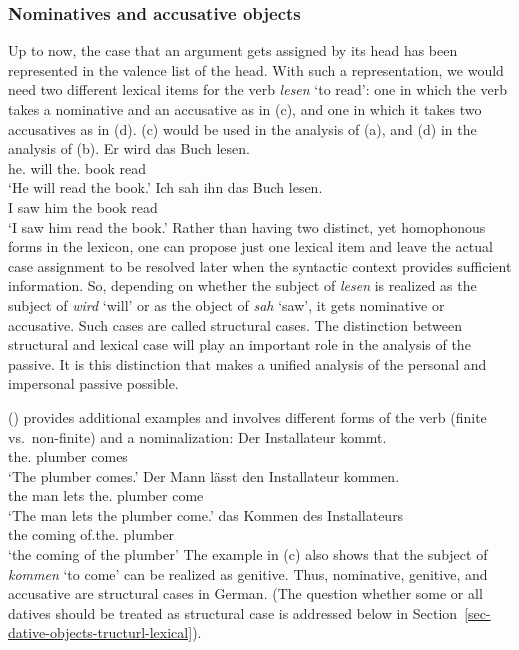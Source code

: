 \subsubsection{Nominatives and accusative objects}

Up to now, the case that an argument gets assigned by its head has been represented in the valence list of
the head. With such a representation, we would need two different lexical items for the verb
\emph{lesen} `to read': one in which the verb takes a nominative and an accusative as in
(c), and one in which it takes two accusatives as in (d). (c) would be used in
the analysis of (a), and (d) in the analysis of (b).
\eal
\ex 
\gll Er        wird das        Buch lesen.\\
     he.\NOM{} will the.\ACC{} book read\\\german
\glt `He will read the book.'
\ex 
\gll Ich sah ihn das Buch lesen.\\
     I   saw him the book read\\
\glt `I saw him read the book.'
\ex {}
\ex {}
\zl
Rather than having two distinct, yet homophonous forms in the lexicon, one can propose just one lexical item and leave the actual
case assignment to be resolved later when the syntactic context provides sufficient information. So,
depending on whether the subject of \emph{lesen} is realized as the 
subject of \emph{wird} `will' or as the object of \emph{sah} `saw', it gets nominative or accusative. Such
cases are called structural cases. The distinction between structural and lexical case will play an
important role in the analysis of the passive. It is this distinction that makes a unified analysis of
the personal and impersonal passive possible.

() provides additional examples and involves different forms of the verb (finite
vs.\ non-finite) and a nominalization:
\eal
\ex 
\gll Der Installateur kommt.\\
     the.\NOM{} plumber      comes\\
\glt `The plumber comes.'
\ex 
\gll Der Mann lässt den Installateur kommen.\\
     the man  lets the.\ACC{} plumber      come\\
\glt `The man lets the plumber come.'
\ex 
\gll das Kommen des Installateurs\\
     the coming of.the.\GEN{} plumber\\
\glt `the coming of the plumber'
\zl
The example in (c) also shows that the subject of \emph{kommen} `to come' can be realized as
genitive. Thus, nominative, genitive, and accusative are structural cases in German. (The question
whether some or all datives should be treated as structural case is addressed below in Section~\ref{sec-dative-objects-tructurl-lexical}).

